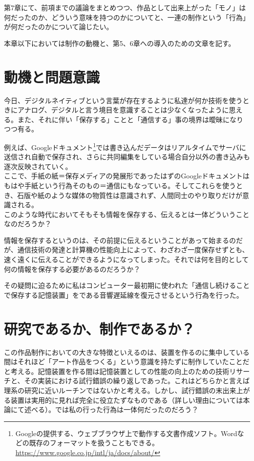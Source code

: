 第7章にて、前項までの議論をまとめつつ、作品として出来上がった「モノ」は何だったのか、どういう意味を持つのかについてと、一連の制作という「行為」が何だったのかについて論じたい。

本章以下においては制作の動機と、第5、6章への導入のための文章を記す。

\section{動機と問題意識}\label{ux52d5ux6a5fux3068ux554fux984cux610fux8b58}

今日、デジタルネイティブという言葉が存在するように私達が何か技術を使うときにアナログ、デジタルと言う境目を意識することは少なくなったように思える。また、それに伴い「保存する」ことと「通信する」事の境界は曖昧になりつつ有る。

例えば、Googleドキュメント\footnote{Googleの提供する、ウェブブラウザ上で動作する文書作成ソフト。Wordなどの既存のフォーマットを扱うこともできる。\url{https://www.google.co.jp/intl/ja/docs/about/}}では書き込んだデータはリアルタイムでサーバに送信され自動で保存され、さらに共同編集をしている場合自分以外の書き込みも逐次反映されていく。\\
ここで、手紙の紙＝保存メディアの発展形であったはずのGoogleドキュメントはもはや手紙という行為そのもの＝通信にもなっている。そしてこれらを使うとき、石版や紙のような媒体の物質性は意識されず、人間同士のやり取りだけが意識される。\\
このような時代においてそもそも情報を保存する、伝えるとは一体どういうことなのだろうか？

情報を保存するというのは、その前提に伝えるということがあって始まるのだが、通信技術の発達と計算機の性能向上によって、わざわざ一度保存せずとも、速く遠くに伝えることができるようになってしまった。それでは何を目的として何の情報を保存する必要があるのだろうか？

その疑問に迫るために私はコンピューター最初期に使われた「通信し続けることで保存する記憶装置」をである音響遅延線を復元させるという行為を行った。

\section{研究であるか、制作であるか？}\label{ux7814ux7a76ux3067ux3042ux308bux304bux5236ux4f5cux3067ux3042ux308bux304b}

この作品制作においての大きな特徴といえるのは、装置を作るのに集中している間はそれほど「アート作品をつくる」という意識を持たずに制作していたことだと考える。記憶装置を作る間は記憶装置としての性能の向上のための技術リサーチと、その実装における試行錯誤の繰り返しであった。これはどちらかと言えば理系の研究に近いルーチンではないかと考える。しかし、試行錯誤の末出来上がる装置は実用的に見れば完全に役立たずなものである（詳しい理由については本論にて述べる）。では私の行った行為は一体何だったのだろう？

